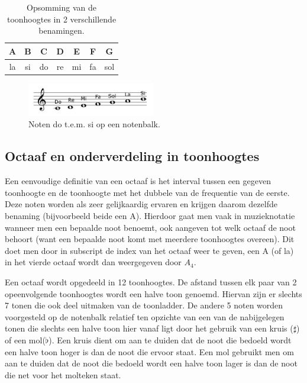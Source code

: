 \begin{table}
  \centering
  \begin{tabular}{ c c c c c c c }
    A & B & C & D & E & F & G \\
    \hline
    \hline
    la & si & do & re & mi & fa & sol \\
  \end{tabular}
  \caption{Opsomming van de toonhoogtes in 2 verschillende benamingen.}
  \label{tabel:toonhoogte}
\end{table}

\begin{figure}[!ht]
  \centering
  \includegraphics[width=0.5\textwidth]{1_Muzikale_Achtergrond/toonladder}
  \caption{Noten do t.e.m. si op een notenbalk.}
  \label{figuur:toonladder}
\end{figure}

\subsection{Octaaf en onderverdeling in toonhoogtes}
Een eenvoudige definitie van een octaaf is het interval tussen een gegeven toonhoogte en de toonhoogte met het dubbele van de frequentie van de eerste. Deze noten worden als zeer gelijkaardig ervaren en krijgen daarom dezelfde benaming (bijvoorbeeld beide een A). Hierdoor gaat men vaak in muzieknotatie wanneer men een bepaalde noot benoemt, ook aangeven tot welk octaaf de noot behoort (want een bepaalde noot komt met meerdere toonhoogtes overeen). Dit doet men door in subscript de index van het octaaf weer te geven, een A (of la) in het vierde octaaf wordt dan weergegeven door $A_{4}$.

Een octaaf wordt opgedeeld in 12 toonhoogtes. De afstand tussen elk paar van 2 opeenvolgende toonhoogtes wordt een halve toon genoemd. Hiervan zijn er slechts 7 tonen die ook deel uitmaken van de toonladder. De andere 5 noten worden voorgesteld op de notenbalk relatief ten opzichte van een van de nabijgelegen tonen die slechts een halve toon hier vanaf ligt door het gebruik van een kruis ($\sharp$) of een mol($\flat$). Een kruis dient om aan te duiden dat de noot die bedoeld wordt een halve toon hoger is dan de noot die ervoor staat. Een mol gebruikt men om aan te duiden dat de noot die bedoeld wordt een halve toon lager is dan de noot die net voor het molteken staat.

